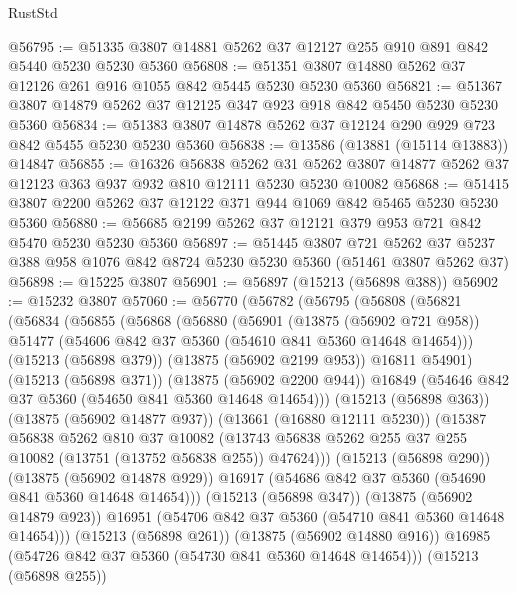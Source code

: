 \begin{lexlean}{RustStd}
\begin{coremodule}
@56795 := @51335 @3807 @14881 @5262 @37 @12127 @255 @910 @891 @842 @5440 @5230 @5230 @5360
@56808 := @51351 @3807 @14880 @5262 @37 @12126 @261 @916 @1055 @842 @5445 @5230 @5230 @5360
@56821 := @51367 @3807 @14879 @5262 @37 @12125 @347 @923 @918 @842 @5450 @5230 @5230 @5360
@56834 := @51383 @3807 @14878 @5262 @37 @12124 @290 @929 @723 @842 @5455 @5230 @5230 @5360
@56838 := @13586 (@13881 (@15114 @13883)) @14847
@56855 := @16326
    @56838
    @5262
    @31
    @5262
    @3807
    @14877
    @5262
    @37
    @12123
    @363
    @937
    @932
    @810
    @12111
    @5230
    @5230
    @10082
@56868 := @51415 @3807 @2200 @5262 @37 @12122 @371 @944 @1069 @842 @5465 @5230 @5230 @5360
@56880 := @56685 @2199 @5262 @37 @12121 @379 @953 @721 @842 @5470 @5230 @5230 @5360
@56897 := @51445
    @3807
    @721
    @5262
    @37
    @5237
    @388
    @958
    @1076
    @842
    @8724
    @5230
    @5230
    @5360
    (@51461 @3807 @5262 @37)
@56898 := @15225 @3807
@56901 := @56897 (@15213 (@56898 @388))
@56902 := @15232 @3807
@57060 := @56770
    (@56782
      (@56795
        (@56808
          (@56821
            (@56834
              (@56855
                (@56868
                  (@56880
                    (@56901
                      (@13875 (@56902 @721 @958))
                      @51477
                      (@54606 @842 @37 @5360 (@54610 @841 @5360 @14648 @14654)))
                    (@15213 (@56898 @379))
                    (@13875 (@56902 @2199 @953))
                    @16811
                    @54901)
                  (@15213 (@56898 @371))
                  (@13875 (@56902 @2200 @944))
                  @16849
                  (@54646 @842 @37 @5360 (@54650 @841 @5360 @14648 @14654)))
                (@15213 (@56898 @363))
                (@13875 (@56902 @14877 @937))
                (@13661 (@16880 @12111 @5230))
                (@15387
                  @56838
                  @5262
                  @810
                  @37
                  @10082
                  (@13743 @56838 @5262 @255 @37 @255 @10082 (@13751 (@13752 @56838 @255)) @47624)))
              (@15213 (@56898 @290))
              (@13875 (@56902 @14878 @929))
              @16917
              (@54686 @842 @37 @5360 (@54690 @841 @5360 @14648 @14654)))
            (@15213 (@56898 @347))
            (@13875 (@56902 @14879 @923))
            @16951
            (@54706 @842 @37 @5360 (@54710 @841 @5360 @14648 @14654)))
          (@15213 (@56898 @261))
          (@13875 (@56902 @14880 @916))
          @16985
          (@54726 @842 @37 @5360 (@54730 @841 @5360 @14648 @14654)))
        (@15213 (@56898 @255))

\end{coremodule}
\end{lexlean}
